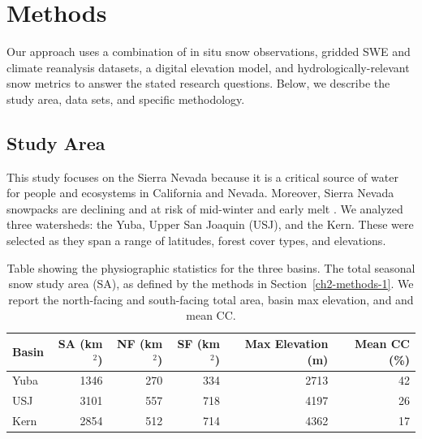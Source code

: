 \hypertarget{ch2-sa}{\section{Methods}\label{ch2-sa}}

Our approach uses a combination of in situ snow observations, gridded SWE and climate reanalysis datasets, a digital elevation model, and hydrologically-relevant snow metrics to answer the stated research questions. Below, we describe the study area, data sets, and specific methodology.

\hypertarget{ch2-sa}{\subsection{Study Area}\label{ch2-sa}}

This study focuses on the Sierra Nevada because it is a critical source of water for people and ecosystems in California and Nevada. Moreover, Sierra Nevada snowpacks are declining and at risk of mid-winter and early melt \citep{hatchettMidwinterDrySpells2023}. We analyzed three watersheds: the Yuba, Upper San Joaquin (USJ), and the Kern. These were selected as they span a range of latitudes, forest cover types, and elevations.

\begin{table}[htbp]
  \centering
  \caption{Table showing the physiographic statistics for the three basins. The total seasonal snow study area (SA), as defined by the methods in Section~\ref{ch2-methods-1}. We report the north-facing and south-facing total area, basin max elevation, and and mean CC.}
  \label{tab:snow_metrics_val_table}
  \begin{tabular}{lrrrrr}
    \toprule
    Basin & SA (km$^{2}$) & NF (km$^{2}$) & SF (km$^{2}$) & Max Elevation (m) & Mean CC (\%) \\
    \midrule
    Yuba  & 1346 & 270 & 334 & 2713 & 42 \\
    USJ   & 3101 & 557 & 718 & 4197 & 26 \\
    Kern  & 2854 & 512 & 714 & 4362 & 17 \\
    \bottomrule
  \end{tabular}
\end{table}


